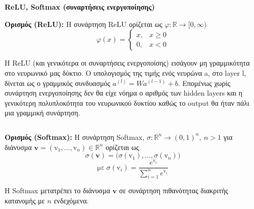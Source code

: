 \documentclass[a4paper,12pt]{article}
\begin{document}


\newpage


\section*{}
\begin{center}
    \Large \textbf{ReLU, Softmax (συναρτήσεις ενεργοποίησης)}
\end{center}

\textbf{Ορισμός (ReLU):} Η συνάρτηση ReLU ορίζεται ως $φ: \mathbb{R} \to [0,\infty)$  
\[
φ(x) =
\begin{cases} 
x, & x \geq 0 \\
0, & x < 0
\end{cases}
\]

Η ReLU (και γενικότερα οι συναρτήσεις ενεργοποίσης) εισάγουν μη γραμμικότητα στο νευρωνικό μας δύκτιο. Ο υπολογισμός της τιμής ενός νευρώνα a, στο layer l, δίνεται ως ο γραμμικός συνδυασμός $a^{(l)} = Wa^{(l-1)} + b$. Επομένως χωρίς συνάρτηση ενεργοποίησης δεν θα είχε νόημα ο αριθμός των hidden layers και η γενικότερη πολυπλοκότητα του νευρωνικού δυκτίου καθώς το output θα ήταν πάλι μια γραμμική συνάρτηση.

$$$$

\textbf{Ορισμός (Softmax):} Η συνάρτηση Softmax, $σ: \mathbb{R}^n \to (0,1)^n , \ n>1$ για διάνυσμα $\mathbf{v} = (\mathrm{v}_1, \dots, \mathrm{v}_n) \in \mathbb{R}^n$ ορίζεται ως 
$$
σ(\mathbf{v}) = \big(σ(\mathrm{v}_1), \dots , σ(\mathrm{v}_n) \big)
$$
$$
\text{με} \ σ(\mathrm{v}_i) = \frac{e^{\mathrm{v}_i}}{\sum_{i=1}^n e^{\mathrm{v}_i}} 
$$

Η Softmax μετατρέπει το διάνυσμα $\mathbf{v}$ σε συνάρτηση πιθανότητας διακριτής κατανομής με $n$ ενδεχόμενα.

\end{document}
